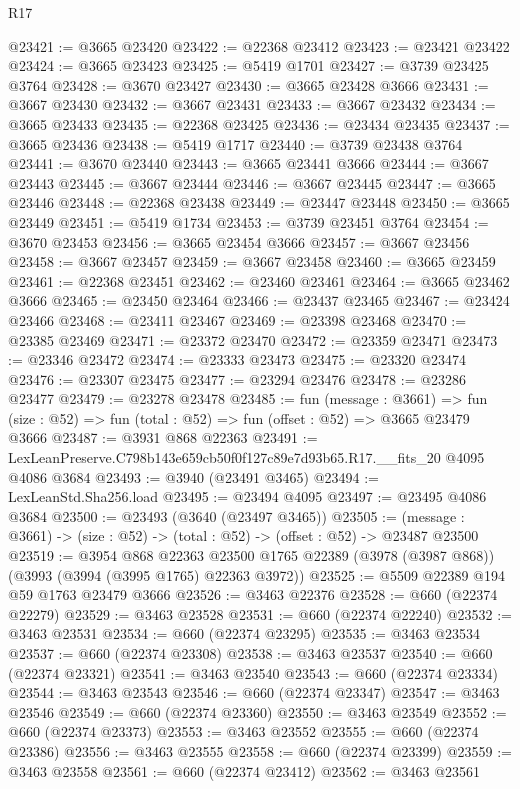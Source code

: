 \begin{lexlean}{R17}
\begin{coremodule}
@23421 := @3665 @23420
@23422 := @22368 @23412
@23423 := @23421 @23422
@23424 := @3665 @23423
@23425 := @5419 @1701
@23427 := @3739 @23425 @3764
@23428 := @3670 @23427
@23430 := @3665 @23428 @3666
@23431 := @3667 @23430
@23432 := @3667 @23431
@23433 := @3667 @23432
@23434 := @3665 @23433
@23435 := @22368 @23425
@23436 := @23434 @23435
@23437 := @3665 @23436
@23438 := @5419 @1717
@23440 := @3739 @23438 @3764
@23441 := @3670 @23440
@23443 := @3665 @23441 @3666
@23444 := @3667 @23443
@23445 := @3667 @23444
@23446 := @3667 @23445
@23447 := @3665 @23446
@23448 := @22368 @23438
@23449 := @23447 @23448
@23450 := @3665 @23449
@23451 := @5419 @1734
@23453 := @3739 @23451 @3764
@23454 := @3670 @23453
@23456 := @3665 @23454 @3666
@23457 := @3667 @23456
@23458 := @3667 @23457
@23459 := @3667 @23458
@23460 := @3665 @23459
@23461 := @22368 @23451
@23462 := @23460 @23461
@23464 := @3665 @23462 @3666
@23465 := @23450 @23464
@23466 := @23437 @23465
@23467 := @23424 @23466
@23468 := @23411 @23467
@23469 := @23398 @23468
@23470 := @23385 @23469
@23471 := @23372 @23470
@23472 := @23359 @23471
@23473 := @23346 @23472
@23474 := @23333 @23473
@23475 := @23320 @23474
@23476 := @23307 @23475
@23477 := @23294 @23476
@23478 := @23286 @23477
@23479 := @23278 @23478
@23485 := fun (message : @3661) =>
  fun (size : @52) => fun (total : @52) => fun (offset : @52) => @3665 @23479 @3666
@23487 := @3931 @868 @22363
@23491 := LexLeanPreserve.C798b143e659cb50f0f127c89e7d93b65.R17.__fits_20 @4095 @4086 @3684
@23493 := @3940 (@23491 @3465)
@23494 := LexLeanStd.Sha256.load
@23495 := @23494 @4095
@23497 := @23495 @4086 @3684
@23500 := @23493 (@3640 (@23497 @3465))
@23505 := (message : @3661) -> (size : @52) -> (total : @52) -> (offset : @52) -> @23487 @23500
@23519 := @3954
    @868
    @22363
    @23500
    @1765
    @22389
    (@3978 (@3987 @868))
    (@3993 (@3994 (@3995 @1765) @22363 @3972))
@23525 := @5509 @22389 @194 @59 @1763 @23479 @3666
@23526 := @3463 @22376
@23528 := @660 (@22374 @22279)
@23529 := @3463 @23528
@23531 := @660 (@22374 @22240)
@23532 := @3463 @23531
@23534 := @660 (@22374 @23295)
@23535 := @3463 @23534
@23537 := @660 (@22374 @23308)
@23538 := @3463 @23537
@23540 := @660 (@22374 @23321)
@23541 := @3463 @23540
@23543 := @660 (@22374 @23334)
@23544 := @3463 @23543
@23546 := @660 (@22374 @23347)
@23547 := @3463 @23546
@23549 := @660 (@22374 @23360)
@23550 := @3463 @23549
@23552 := @660 (@22374 @23373)
@23553 := @3463 @23552
@23555 := @660 (@22374 @23386)
@23556 := @3463 @23555
@23558 := @660 (@22374 @23399)
@23559 := @3463 @23558
@23561 := @660 (@22374 @23412)
@23562 := @3463 @23561

\end{coremodule}
\end{lexlean}
